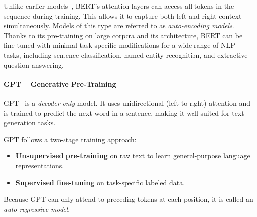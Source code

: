 Unlike earlier models~\cite{peters-etal-2018-deep, GPT}, BERT’s attention layers can access all tokens in the sequence during training. This allows it to capture both left and right context simultaneously. Models of this type are referred to as \textit{auto-encoding models}.
Thanks to its pre-training on large corpora and its architecture, BERT can be fine-tuned with minimal task-specific modifications for a wide range of NLP tasks, including sentence classification, named entity recognition, and extractive question answering.

\paragraph{GPT – Generative Pre-Training}
GPT~\cite{GPT} is a \textit{decoder-only} model. It uses unidirectional (left-to-right) attention and is trained to predict the next word in a sentence, making it well suited for text generation tasks.

GPT follows a two-stage training approach:
\begin{itemize}
    \item \textbf{Unsupervised pre-training} on raw text to learn general-purpose language representations.
    \item \textbf{Supervised fine-tuning} on task-specific labeled data.
\end{itemize}

Because GPT can only attend to preceding tokens at each position, it is called an \textit{auto-regressive model}.



